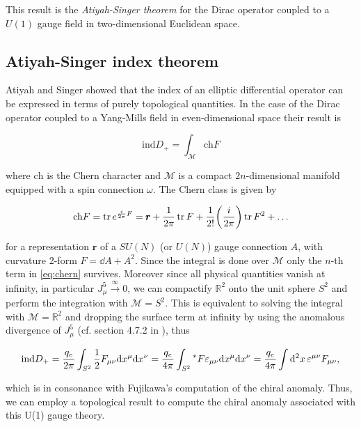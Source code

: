 This result is the \emph{Atiyah-Singer theorem} for the Dirac operator coupled to a $U(1)$ gauge field in two-dimensional Euclidean space.


\subsection{Atiyah-Singer index theorem}\label{ssec:Atiyah}

Atiyah and Singer \cite{Atiyah1963} showed that the index of an elliptic differential operator can be expressed in terms of purely topological quantities. In the case of the Dirac operator coupled to a Yang-Mills field in even-dimensional space their result is

\begin{equation}
\text{ind}D_+ = \int_{\mathcal{M}}\text{ch}F
\end{equation}

where $\text{ch}$ is the Chern character and $\mathcal{M}$ is a compact $2n$-dimensional manifold equipped with a spin connection $\omega$. The Chern class is given by

\begin{equation}
\text{ch}F = \tr e^{\frac{i}{2\pi}F} = \pmb r + \frac{1}{2\pi}\tr F + \frac{1}{2!}\qty(\frac{i}{2 \pi})\tr F^2 + \ldots
\label{eq:chern}
\end{equation}

for a representation $\pmb r$ of a $SU(N)$ (or $U(N)$) gauge connection $A$, with curvature 2-form $F=\dd A + A^2$. Since the integral is done over $\mathcal{M}$ only the $n$-th term in
\eqref{eq:chern} survives. Moreover since all physical quantities vanish at infinity, in particular $J_\mu^5 \overset{\infty}{\longrightarrow} 0$, we can compactify $\mathbb{R}^2$ onto the unit sphere $S^2$ and perform the integration with $\mathcal{M}=S^2$. This is equivalent to solving the integral with $\mathcal{M}=\mathbb{R}^2$ and dropping the surface term at infinity by using the anomalous divergence of $J_\mu^5$ (cf. section 4.7.2 in \cite{abdalla}), thus

\begin{equation}
\text{ind}D_+ = \frac{q_e}{2\pi}\int_{S^2}\frac{1}{2} F_{\mu\nu}\dd x^\mu \dd x^\nu = \frac{q_e}{4\pi}\int_{S^2} {}^\ast F \varepsilon_{\mu\nu} \dd x^\mu \dd x^\nu = \frac{q_e}{4\pi}\int\dd[2]{x}\varepsilon^{\mu\nu} F_{\mu\nu},
\end{equation}

which is in consonance with Fujikawa's computation of the chiral anomaly. Thus, we can employ a topological result to compute the chiral anomaly associated with this U(1) gauge theory.


